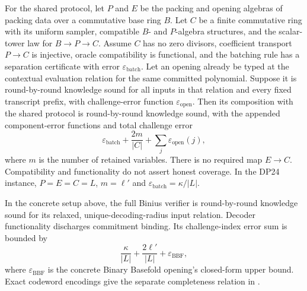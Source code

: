 \begin{theorem}
  \leanok
  \label{thm:ring_switching_soundness}
  For the shared protocol, let $P$ and $E$ be the packing and opening algebras of packing data
  over a commutative base ring $B$. Let $C$ be a finite commutative ring with its uniform
  sampler, compatible $B$- and $P$-algebra structures, and the scalar-tower law for
  $B \to P \to C$. Assume $C$ has no zero divisors, coefficient transport $P \to C$ is
  injective, oracle compatibility is functional, and the batching rule has a separation
  certificate with error $\varepsilon_{\mathrm{batch}}$. Let an opening already be typed at
  the contextual evaluation relation for the same committed polynomial. Suppose it is
  round-by-round knowledge sound for all inputs in that relation and every fixed transcript
  prefix, with challenge-error function $\varepsilon_{\mathrm{open}}$. Then its composition with the shared
  protocol is round-by-round knowledge sound, with the appended component-error functions and
  total challenge error
  \[
    \varepsilon_{\mathrm{batch}} + \frac{2m}{\lvert C\rvert}
      + \sum_j \varepsilon_{\mathrm{open}}(j),
  \]
  where $m$ is the number of retained variables. There is no required map $E \to C$.
  Compatibility and functionality do not assert honest coverage. In the DP24 instance,
  $P = E = C = L$, $m = \ell'$ and $\varepsilon_{\mathrm{batch}} = \kappa/\lvert L\rvert$.
\end{theorem}

\begin{theorem}
  \leanok
  \label{thm:binius_ring_switching_soundness}
  In the concrete setup above, the full Binius verifier is round-by-round
  knowledge sound for its
  relaxed, unique-decoding-radius input relation. Decoder functionality discharges commitment
  binding. Its challenge-index error sum is bounded by
  \[
    \frac{\kappa}{\lvert L\rvert} + \frac{2\ell'}{\lvert L\rvert}
      + \varepsilon_{\mathrm{BBF}},
  \]
  where $\varepsilon_{\mathrm{BBF}}$ is the concrete Binary Basefold opening's closed-form upper
  bound. Exact codeword encodings give the separate completeness relation in
  .
\end{theorem}

